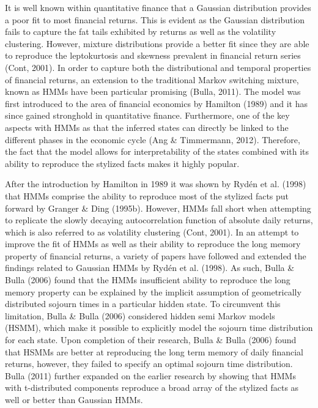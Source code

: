 It is well known within quantitative finance that a Gaussian distribution provides a poor fit to most financial returns. This is evident as the Gaussian distribution fails to capture the fat tails exhibited by returns as well as the volatility clustering. However, mixture distributions provide a better fit since they are able to reproduce the leptokurtosis and skewness prevalent in financial return series (Cont, 2001). In order to capture both the distributional and temporal properties of financial returns, an extension to the traditional Markov switching mixture, known as HMMs have been particular promising (Bulla, 2011). The model was first introduced to the area of financial economics by Hamilton (1989) and it has since gained stronghold in quantitative finance. Furthermore, one of the key aspects with HMMs as that the inferred states can directly be linked to the different phases in the economic cycle (Ang \& Timmermann, 2012). Therefore, the fact that the model allows for interpretability of the states combined with its ability to reproduce the stylized facts makes it highly popular. 

After the introduction by Hamilton in 1989 it was shown by Rydén et al. (1998) that HMMs comprise the ability to reproduce most of the stylized facts put forward by Granger \& Ding (1995b). However, HMMs fall short when attempting to replicate the slowly decaying autocorrelation function of absolute daily returns, which is also referred to as volatility clustering (Cont, 2001). In an attempt to improve the fit of HMMs as well as their ability to reproduce the long memory property of financial returns, a variety of papers have followed and extended the findings related to Gaussian HMMs by Rydén et al. (1998). As such, Bulla \& Bulla (2006) found that the HMMs insufficient ability to reproduce the long memory property can be explained by the implicit assumption of geometrically distributed sojourn times in a particular hidden state. To circumvent this limitation, Bulla \& Bulla (2006) considered hidden semi Markov models (HSMM), which make it possible to explicitly model the sojourn time distribution for each state. Upon completion of their research, Bulla \& Bulla (2006) found that HSMMs are better at reproducing the long term memory of daily financial returns, however, they failed to specify an optimal sojourn time distribution. Bulla (2011) further expanded on the earlier research by showing that HMMs with t-distributed components reproduce a broad array of the stylized facts as well or better than Gaussian HMMs. 

